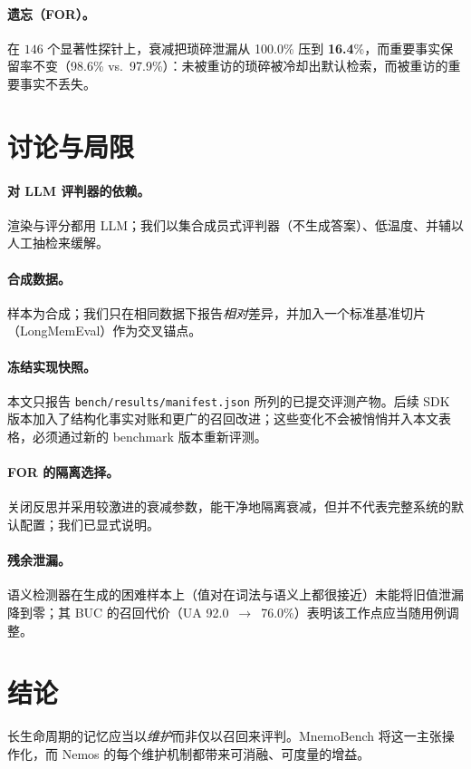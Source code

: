 \documentclass[11pt,fontset=fandol]{ctexart}
\newcommand{\bucUAfull}{76.0}
\newcommand{\bucUAnone}{92.0}
\newcommand{\forTLdecay}{\textbf{16.4}}
\newcommand{\forTLnone}{100.0}
\newcommand{\forIFRdecay}{97.9}
\newcommand{\forIFRnone}{98.6}
\begin{document}
\paragraph{遗忘（FOR）。}在 $146$ 个显著性探针上，衰减把琐碎泄漏从 \forTLnone{}\% 压到 \forTLdecay{}\%，而重要事实保留率不变（\forIFRnone{}\% vs.\ \forIFRdecay{}\%）：未被重访的琐碎被冷却出默认检索，而被重访的重要事实不丢失。

\section{讨论与局限}
\label{sec:limits}
\paragraph{对 LLM 评判器的依赖。}渲染与评分都用 LLM；我们以集合成员式评判器（不生成答案）、低温度、并辅以人工抽检来缓解。
\paragraph{合成数据。}样本为合成；我们只在相同数据下报告\emph{相对}差异，并加入一个标准基准切片（LongMemEval）作为交叉锚点。

\paragraph{冻结实现快照。}本文只报告 \texttt{bench/results/manifest.json} 所列的已提交评测产物。后续 SDK 版本加入了结构化事实对账和更广的召回改进；这些变化不会被悄悄并入本文表格，必须通过新的 benchmark 版本重新评测。
\paragraph{FOR 的隔离选择。}关闭反思并采用较激进的衰减参数，能干净地隔离衰减，但并不代表完整系统的默认配置；我们已显式说明。
\paragraph{残余泄漏。}语义检测器在生成的困难样本上（值对在词法与语义上都很接近）未能将旧值泄漏降到零；其 BUC 的召回代价（UA \bucUAnone{}~$\rightarrow$~\bucUAfull{}\%）表明该工作点应当随用例调整。

\section{结论}
长生命周期的记忆应当以\emph{维护}而非仅以召回来评判。MnemoBench 将这一主张操作化，而 Nemos 的每个维护机制都带来可消融、可度量的增益。



\end{document}
